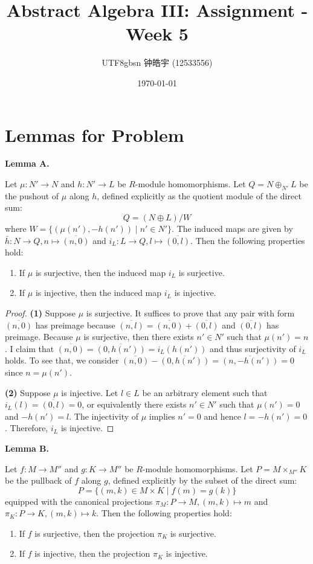 \documentclass[12pt, a4paper]{article}
\title{Abstract Algebra III: Assignment - Week 5}
\author{
    \begin{CJK*}{UTF8}{gbsn}
    钟皓宇 (12533556)
    \end{CJK*}
}
\date{\today}
\theoremstyle{remark}
\newenvironment{lemma}[1]{
    \noindent \textbf{Lemma #1.} \itshape
}{
    \vspace{1em}
}
\begin{document}
\maketitle

\section*{Lemmas for Problem}
\begin{lemma}{A}
Let $\mu: N' \to N$ and $h: N' \to L$ be $R$-module homomorphisms. Let $Q = N \oplus_{N'} L$ be the pushout of $\mu$ along $h$, defined explicitly as the quotient module of the direct sum:
\[ Q = (N \oplus L) / W \]
where $W = \{(\mu(n'), -h(n')) \mid n' \in N'\}$. The induced maps are given by $\bar{h}: N \to Q, n \mapsto \overline{(n, 0)}$ and $i_L: L \to Q, l \mapsto \overline{(0, l)}$. Then the following properties hold:
\begin{enumerate}
    \item If $\mu$ is surjective, then the induced map $i_L$ is surjective.
    \item If $\mu$ is injective, then the induced map $i_L$ is injective.
\end{enumerate}
\end{lemma}
\begin{proof}
\textbf{(1)} Suppose $\mu$ is surjective. It suffices to prove that any pair with form $\overline{(n,0)}$ has preimage because $\overline{(n,l)} = \overline{(n,0)}+\overline{(0,l)}$ and $\overline{(0,l)}$ has preimage.
Because $\mu$ is surjective, then there exists $n'\in N'$ such that $\mu(n')=n$. I claim that $\overline{(n,0)} = \overline{(0,h(n'))}= i_L(h(n'))$ and thus surjectivity of $i_L$ holds.
To see that, we consider $\overline{(n,0)}-\overline{(0,h(n'))} = \overline{(n,-h(n'))}=0$ since $n=\mu(n')$.

\textbf{(2)} Suppose $\mu$ is injective. Let $l\in L$ be an arbitrary element such that $i_L(l)= \overline{(0,l)}=0$, or equivalently there exists $n'\in N'$ such that $\mu(n')=0$ and $-h(n')=l$.
The injectivity of $\mu$ implies $n'=0$ and hence $l=-h(n')=0$. Therefore, $i_L$ is injective.
\end{proof}

\begin{lemma}{B}
Let $f: M \to M''$ and $g: K \to M''$ be $R$-module homomorphisms. Let $P = M \times_{M''} K$ be the pullback of $f$ along $g$, defined explicitly by the subset of the direct sum:
\[ P = \{ (m, k) \in M \times K \mid f(m) = g(k) \} \]
equipped with the canonical projections $\pi_M: P \to M, (m, k) \mapsto m$ and $\pi_K: P \to K, (m, k) \mapsto k$. Then the following properties hold:
\begin{enumerate}
    \item If $f$ is surjective, then the projection $\pi_K$ is surjective.
    \item If $f$ is injective, then the projection $\pi_K$ is injective.
\end{enumerate}
\end{lemma}
\end{document}
